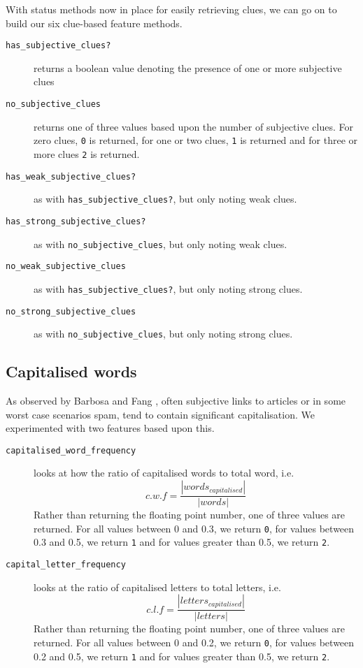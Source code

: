With status methods now in place for easily retrieving clues, we can go on to build our six clue-based feature methods.

\begin{description}
	\item [\texttt{has\_subjective\_clues?}] returns a boolean value denoting the presence of one or more subjective clues
	\item [\texttt{no\_subjective\_clues}] returns one of three values based upon the number of subjective clues. For zero clues, \texttt{0} is returned, for one or two clues, \texttt{1} is returned and for three or more clues \texttt{2} is returned.
	\item [\texttt{has\_weak\_subjective\_clues?}] as with \texttt{has\-\_subjective\-\_clues?}, but only noting weak clues.
	\item [\texttt{has\_strong\_subjective\_clues?}] as with \texttt{no\-\_subjective\-\_clues}, but only noting weak clues.
	\item [\texttt{no\_weak\_subjective\_clues}] as with \texttt{has\-\_subjective\-\_clues?}, but only noting strong clues.
	\item [\texttt{no\_strong\_subjective\_clues}] as with \texttt{no\-\_subjective\-\_clues}, but only noting strong clues.
\end{description}

\subsection{Capitalised words}

As observed by Barbosa and Fang \cite{Barbosa:ws}, often subjective links to articles or in some worst case scenarios spam, tend to contain significant capitalisation. We experimented with two features based upon this.

\begin{description}
	\item [\texttt{capitalised\_word\_frequency}] {looks at how the ratio of capitalised words to total word, i.e.
	\begin{equation}
		c.w.f = \frac{|words_{capitalised}|}{|words|}
	\end{equation}
	Rather than returning the floating point number, one of three values are returned. For all values between 0 and 0.3, we return \texttt{0}, for values between 0.3 and 0.5, we return \texttt{1} and for values greater than 0.5, we return \texttt{2}.
	}
	\item [\texttt{capital\_letter\_frequency}] looks at the ratio of capitalised letters to total letters, i.e.
	\begin{equation}
		c.l.f = \frac{|letters_{capitalised}|}{|letters|}
	\end{equation}
	Rather than returning the floating point number, one of three values are returned. For all values between 0 and 0.2, we return \texttt{0}, for values between 0.2 and 0.5, we return \texttt{1} and for values greater than 0.5, we return \texttt{2}.
\end{description}

